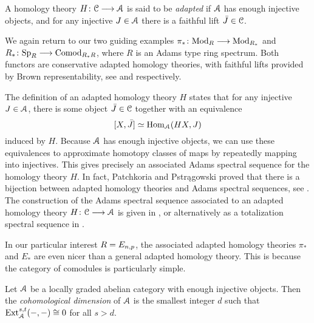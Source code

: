 \begin{definition}
    \label{ch1:def:adapted-homology-theory}
    A homology theory $H\colon \EuScript{C}\longrightarrow \EuScript{A}$ is said to be \emph{adapted} if $\EuScript{A}$ has enough injective objects, and for any injective $J \in \EuScript{A}$ there is a faithful lift $\bar{J}\in \EuScript{C}$. 
\end{definition}

\begin{example}
    We again return to our two guiding examples $\pi_*\colon \mathrm{Mod}_R\longrightarrow \mathrm{Mod}_{R_*}$ and $R_*\colon \mathrm{Sp}_R\longrightarrow \mathrm{Comod}_{R_*R}$, where $R$ is an Adams type ring spectrum. Both functors are conservative adapted homology theories, with faithful lifts provided by Brown representability, see \cite[8.2]{patchkoria-pstragowski_2021} and \cite[8.13]{patchkoria-pstragowski_2021} respectively. 
\end{example}


\begin{remark}
    The definition of an adapted homology theory $H$ states that for any injective $J\in \EuScript{A}$, there is some object $\bar{J}\in \EuScript{C}$ together with an equivalence 
    \[[X,\bar{J}]\simeq \operatorname{Hom}_{\EuScript{A}}(HX, J)\] 
    induced by $H$. Because $\EuScript{A}$ has enough injective objects, we can use these equivalences to approximate homotopy classes of maps by repeatedly mapping into injectives. This gives precisely an associated Adams spectral sequence for the homology theory $H$. In fact, Patchkoria and Pstr{\k a}gowski proved that there is a bijection between adapted homology theories and Adams spectral sequences, see \cite[3.24, 3.25]{patchkoria-pstragowski_2021}. The construction of the Adams spectral sequence associated to an adapted homology theory $H\colon \EuScript{C}\longrightarrow \EuScript{A}$ is given in \cite[2.24]{patchkoria-pstragowski_2021}, or alternatively as a totalization spectral sequence in \cite[2.27]{patchkoria-pstragowski_2021}. 
\end{remark}

In our particular interest $R=E_{n,p}$, the associated adapted homology theories $\pi_*$ and $E_*$ are even nicer than a general adapted homology theory. This is because the category of comodules is particularly simple. 

\begin{definition}
    \label{ch1:def:cohomological-dimension}
    Let $\EuScript{A}$ be a locally graded abelian category with enough injective objects. Then the \emph{cohomological dimension} of $\EuScript{A}$ is the smallest integer $d$ such that $\operatorname{Ext}^{s,t}_{\EuScript{A}}(-,-) \cong 0$ for all $s>d$. 
\end{definition}

